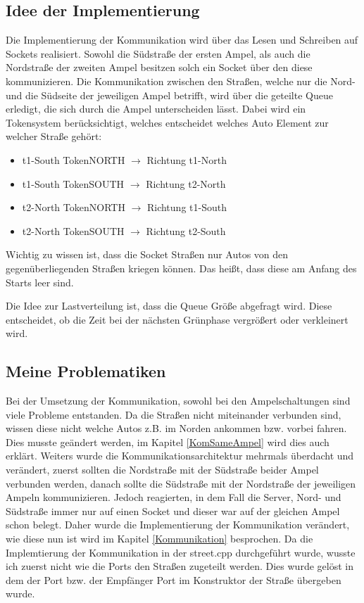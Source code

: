 \documentclass[12pt, oneside]{article}
\begin{document}
\subsection{Idee der Implementierung}
Die Implementierung der Kommunikation wird über das Lesen und Schreiben auf Sockets realisiert. Sowohl die Südstraße der ersten Ampel, als auch die Nordstraße der zweiten Ampel besitzen solch ein Socket über den diese kommunizieren. Die Kommunikation zwischen den Straßen, welche nur die Nord- und die Südseite der jeweiligen Ampel betrifft, wird über die geteilte Queue erledigt, die sich durch die Ampel unterscheiden lässt. Dabei wird ein Tokensystem berücksichtigt, welches entscheidet welches Auto Element zur welcher Straße gehört:
\begin{itemize}
    \item t1-South Token{NORTH} $\rightarrow$ Richtung t1-North
    \item t1-South Token{SOUTH} $\rightarrow$ Richtung t2-North
    \item t2-North Token{NORTH} $\rightarrow$ Richtung t1-South
    \item t2-North Token{SOUTH} $\rightarrow$ Richtung t2-South
\end{itemize}
Wichtig zu wissen ist, dass die Socket Straßen nur Autos von den gegenüberliegenden Straßen kriegen können. Das heißt, dass diese am Anfang des Starts leer sind.\vspace{1em}

\noindent Die Idee zur Lastverteilung ist, dass die Queue Größe abgefragt wird. Diese entscheidet, ob die Zeit bei der nächsten Grünphase vergrößert oder verkleinert wird. 

\subsection{Meine Problematiken}
Bei der Umsetzung der Kommunikation, sowohl bei den Ampelschaltungen sind viele Probleme entstanden. Da die Straßen nicht miteinander verbunden sind, wissen diese nicht welche Autos z.B. im Norden ankommen bzw. vorbei fahren. Dies musste geändert werden, im Kapitel \ref{KomSameAmpel} wird dies auch erklärt. Weiters wurde die Kommunikationsarchitektur mehrmals überdacht und verändert, zuerst sollten die Nordstraße mit der Südstraße beider Ampel verbunden werden, danach sollte die Südstraße mit der Nordstraße der jeweiligen Ampeln kommunizieren. Jedoch reagierten, in dem Fall die Server, Nord- und Südstraße immer nur auf einen Socket und dieser war auf der gleichen Ampel schon belegt. Daher wurde die Implementierung der Kommunikation verändert, wie diese nun ist wird im Kapitel \ref{Kommunikation} besprochen. Da die Implemtierung der Kommunikation in der street.cpp durchgeführt wurde, wusste ich zuerst nicht wie die Ports den Straßen zugeteilt werden. Dies wurde gelöst in dem der Port bzw. der Empfänger Port im Konstruktor der Straße übergeben wurde. 
\end{document}
